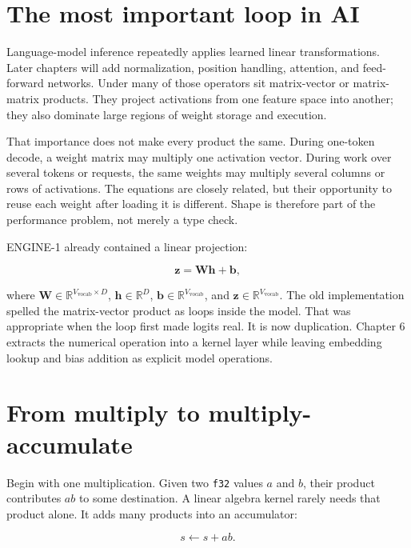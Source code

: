 \section{The most important loop in
AI}\label{the-most-important-loop-in-ai}

Language-model inference repeatedly applies learned linear
transformations. Later chapters will add normalization, position
handling, attention, and feed-forward networks. Under many of those
operators sit matrix-vector or matrix-matrix products. They project
activations from one feature space into another; they also dominate
large regions of weight storage and execution.

That importance does not make every product the same. During one-token
decode, a weight matrix may multiply one activation vector. During work
over several tokens or requests, the same weights may multiply several
columns or rows of activations. The equations are closely related, but
their opportunity to reuse each weight after loading it is different.
Shape is therefore part of the performance problem, not merely a type
check.

ENGINE-1 already contained a linear projection:

\begin{equation}
\mathbf{z}=\mathbf{W}\mathbf{h}+\mathbf{b},
\end{equation}

where \(\mathbf{W}\in\mathbb{R}^{V_{\mathrm{vocab}}\times D}\),
\(\mathbf{h}\in\mathbb{R}^{D}\),
\(\mathbf{b}\in\mathbb{R}^{V_{\mathrm{vocab}}}\), and
\(\mathbf{z}\in\mathbb{R}^{V_{\mathrm{vocab}}}\). The old implementation
spelled the matrix-vector product as loops inside the model. That was
appropriate when the loop first made logits real. It is now duplication.
Chapter 6 extracts the numerical operation into a kernel layer while
leaving embedding lookup and bias addition as explicit model operations.

\section{From multiply to
multiply-accumulate}\label{from-multiply-to-multiply-accumulate}

Begin with one multiplication. Given two \texttt{f32} values \(a\) and
\(b\), their product contributes \(ab\) to some destination. A linear
algebra kernel rarely needs that product alone. It adds many products
into an accumulator:

\begin{equation}
s \leftarrow s + ab.
\end{equation}


